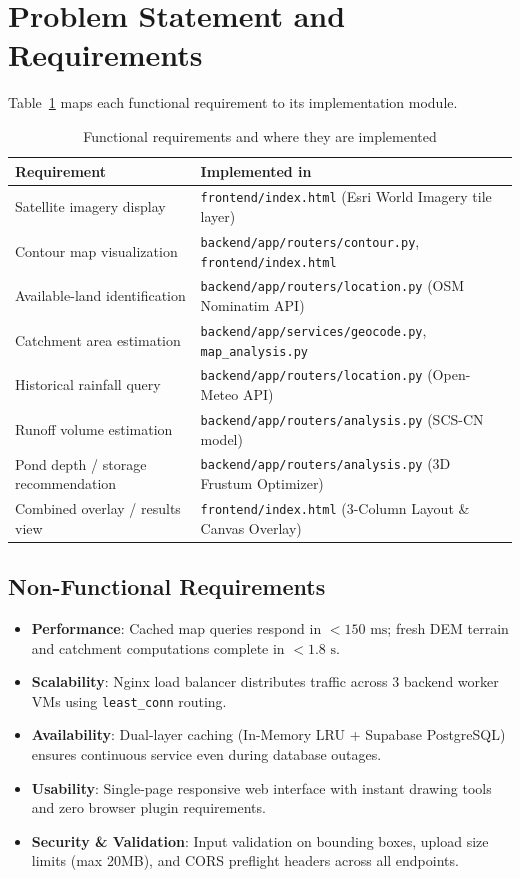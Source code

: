 \documentclass[manuscript,screen]{acmart}
\begin{document}
\section{Problem Statement and Requirements}
\label{sec:requirements}
Table~\ref{tab:requirements} maps each functional requirement to its implementation module.

\begin{table}[h]
  \caption{Functional requirements and where they are implemented}
  \label{tab:requirements}
  \begin{tabular}{p{4.2cm}p{5.5cm}}
    \toprule
    Requirement & Implemented in \\
    \midrule
    Satellite imagery display & \texttt{frontend/index.html} (Esri World Imagery tile layer) \\
    Contour map visualization & \texttt{backend/app/routers/contour.py}, \texttt{frontend/index.html} \\
    Available-land identification & \texttt{backend/app/routers/location.py} (OSM Nominatim API) \\
    Catchment area estimation & \texttt{backend/app/services/geocode.py}, \texttt{map\_analysis.py} \\
    Historical rainfall query & \texttt{backend/app/routers/location.py} (Open-Meteo API) \\
    Runoff volume estimation & \texttt{backend/app/routers/analysis.py} (SCS-CN model) \\
    Pond depth / storage recommendation & \texttt{backend/app/routers/analysis.py} (3D Frustum Optimizer) \\
    Combined overlay / results view & \texttt{frontend/index.html} (3-Column Layout \& Canvas Overlay) \\
    \bottomrule
  \end{tabular}
\end{table}

\subsection{Non-Functional Requirements}
\begin{itemize}[leftmargin=*]
    \item \textbf{Performance}: Cached map queries respond in $< 150\text{ ms}$; fresh DEM terrain and catchment computations complete in $< 1.8\text{ s}$.
    \item \textbf{Scalability}: Nginx load balancer distributes traffic across 3 backend worker VMs using \texttt{least\_conn} routing.
    \item \textbf{Availability}: Dual-layer caching (In-Memory LRU + Supabase PostgreSQL) ensures continuous service even during database outages.
    \item \textbf{Usability}: Single-page responsive web interface with instant drawing tools and zero browser plugin requirements.
    \item \textbf{Security \& Validation}: Input validation on bounding boxes, upload size limits (max 20MB), and CORS preflight headers across all endpoints.
\end{itemize}
\end{document}
